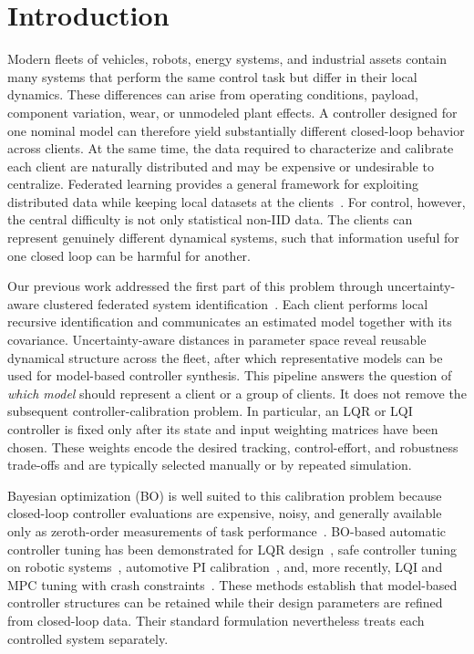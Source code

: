 \documentclass[conference]{IEEEtran}
\begin{document}
\section{Introduction}
\label{sec:introduction}
Modern fleets of vehicles, robots, energy systems, and industrial assets contain many systems that perform the same control task but differ in their local dynamics. These differences can arise from operating conditions, payload, component variation, wear, or unmodeled plant effects. A controller designed for one nominal model can therefore yield substantially different closed-loop behavior across clients. At the same time, the data required to characterize and calibrate each client are naturally distributed and may be expensive or undesirable to centralize. Federated learning provides a general framework for exploiting distributed data while keeping local datasets at the clients~\cite{mcmahan2017communication}. For control, however, the central difficulty is not only statistical non-IID data. The clients can represent genuinely different dynamical systems, such that information useful for one closed loop can be harmful for another.

Our previous work addressed the first part of this problem through uncertainty-aware clustered federated system identification~\cite{weber2026ifac}. Each client performs local recursive identification and communicates an estimated model together with its covariance. Uncertainty-aware distances in parameter space reveal reusable dynamical structure across the fleet, after which representative models can be used for model-based controller synthesis. This pipeline answers the question of \emph{which model} should represent a client or a group of clients. It does not remove the subsequent controller-calibration problem. In particular, an LQR or LQI controller is fixed only after its state and input weighting matrices have been chosen. These weights encode the desired tracking, control-effort, and robustness trade-offs and are typically selected manually or by repeated simulation.

Bayesian optimization (BO) is well suited to this calibration problem because closed-loop controller evaluations are expensive, noisy, and generally available only as zeroth-order measurements of task performance~\cite{frazier2018tutorial}. BO-based automatic controller tuning has been demonstrated for LQR design~\cite{marco2016lqr}, safe controller tuning on robotic systems~\cite{berkenkamp2016safe,berkenkamp2023safe}, automotive PI calibration~\cite{schillinger2017safe}, and, more recently, LQI and MPC tuning with crash constraints~\cite{vonrohr2024local}. These methods establish that model-based controller structures can be retained while their design parameters are refined from closed-loop data. Their standard formulation nevertheless treats each controlled system separately.
\end{document}
